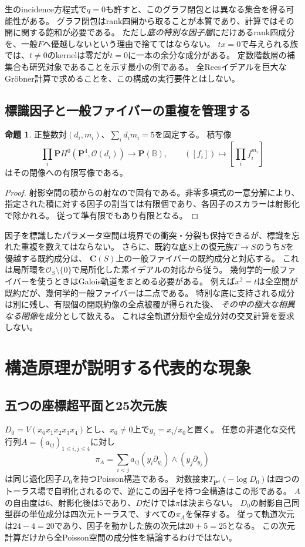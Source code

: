 \documentclass[a4paper,11pt]{ltjsarticle}
\theoremstyle{definition}
\newtheorem{proposition}[theorem]{命題}
\theoremstyle{definition}\newtheorem{definition}[theorem]{定義}
\theoremstyle{remark}\newtheorem{remark}[theorem]{注意}
\newcommand{\PP}{\mathbf P}\newcommand{\CC}{\mathbf C}
\newcommand{\cO}{\mathcal O}\newcommand{\cP}{\mathcal P}
\begin{document}
生のincidence方程式で$q=0$も許すと、このグラフ閉包とは異なる集合を得る可能性がある。
グラフ閉包はrank四開から取ることが本質であり、計算ではその開に関する飽和が必要である。
ただし\emph{底の特別な因子層}にだけあるrank四成分を、一般$F$へ優越しないという理由で捨ててはならない。
$tx=0$で与えられる族では、$t\ne0$のkernelは零だが$t=0$に一本の余分な成分がある。
定数階数層の補集合も研究対象であることを示す最小の例である。
全Reesイデアルを巨大なGr\"obner計算で求めることを、この構成の実行要件とはしない。

\subsection{標識因子と一般ファイバーの重複を管理する}
\begin{proposition}\label{prop:factor-mark}
正整数対$(d_i,m_i)$、$\sum_i d_im_i=5$を固定する。
積写像
\[
 \prod_i\PP H^0(\PP^4,\cO(d_i))\longrightarrow\PP(\mathbb B),
 \qquad([f_i])\longmapsto[\prod_i f_i^{m_i}]
\]
はその閉像への有限写像である。
\end{proposition}
\begin{proof}
射影空間の積からの射なので固有である。非零多項式の一意分解により、
指定された積に対する因子の割当ては有限個であり、各因子のスカラーは射影化で除かれる。
従って準有限でもあり有限となる。
\end{proof}

因子を標識したパラメータ空間は境界での衝突・分裂も保持できるが、標識を忘れた重複を数えてはならない。
さらに、既約な底$S$上の復元族$T\to S$のうち$S$を優越する既約成分は、
$\CC(S)$上の一般ファイバーの既約成分と対応する。
これは局所環を$\cO_S\setminus\{0\}$で局所化した素イデアルの対応から従う。
幾何学的一般ファイバーを使うときはGalois軌道をまとめる必要がある\cite{StacksFibres}。
例えば$x^2=t$は全空間が既約だが、幾何学的一般ファイバーは二点である。
特別な底に支持される成分は別に残し、有限個の閉既約像の全点被覆が得られた後、
\emph{その中の極大な相異なる閉像}を成分として数える。
これは全軌道分類や全成分対の交叉計算を要求しない。



\section{構造原理が説明する代表的な現象}
\subsection{五つの座標超平面と25次元族}
$D_0=V(x_0x_1x_2x_3x_4)$とし、$x_0\ne0$上で$y_i=x_i/x_0$と置く。
任意の非退化な交代行列$A=(a_{ij})_{1\le i,j\le4}$に対し
\[
 \pi_A=\sum_{i<j}a_{ij}(y_i\partial_{y_i})\wedge(y_j\partial_{y_j})
\]
は同じ退化因子$D_0$を持つPoisson構造である。
対数接束$T_{\PP^4}(-\log D_0)$は四つのトーラス場で自明化されるので、逆にこの因子を持つ全構造はこの形である。
$A$の自由度は6、射影化後は5であり、$D$だけでは$\pi$は決まらない。
$D_0$の射影自己同型群の単位成分は四次元トーラスで、すべての$\pi_A$を保存する。
従って軌道次元は$24-4=20$であり、因子を動かした族の次元は$20+5=25$となる。
この次元計算だけから全Poisson空間の成分性を結論するわけではない。
\end{document}
